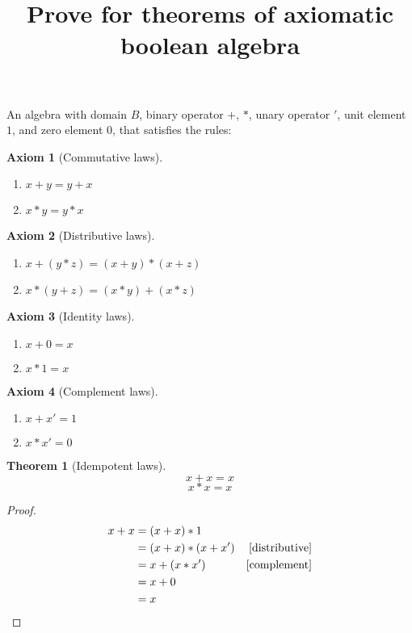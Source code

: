 \documentclass{article}
\newtheorem{theorem}{Theorem}[section]
\newtheorem{axiom}{Axiom}[section]
\begin{document}
\title{Prove for theorems of axiomatic boolean algebra}

An algebra with domain $B$, binary operator $+$, $*$, unary operator $'$, unit element $1$, and zero element $0$,
that satisfies the rules:

\begin{axiom}[Commutative laws]~ %
\label{commutative}
\begin{enumerate}
  \item $x + y = y + x$ 
  \item $x * y = y * x$
\end{enumerate}
\end{axiom}

\begin{axiom}[Distributive laws]~ %
\label{distributive}
\begin{enumerate}
  \item $x + (y * z) = (x + y) * (x + z)$
  \item $x * (y + z) = (x * y) + (x * z)$
\end{enumerate}
\end{axiom}

\begin{axiom}[Identity laws]~ %
\label{identity}
\begin{enumerate}
  \item $x + 0 = x$
  \item $x * 1 = x$
\end{enumerate}
\end{axiom}

\begin{axiom}[Complement laws]~ %
\label{complement}
\begin{enumerate}
  \item $x + x' = 1$
  \item $x * x' = 0$
\end{enumerate}
\end{axiom}

\newpage
\begin{theorem}[Idempotent laws]

\label{idempotent}
\[ x + x = x \]
\[ x * x = x \]
\end{theorem}

\begin{proof}
\begin{align*}
x + x & = (x + x) * 1 \\
      & = (x + x) * (x + x') & \ref{distributive} \\
      & = x + (x * x')       & \ref{complement} \\
      & = x + 0 \\
      & = x
\end{align*}
\end{proof}
\end{document}
